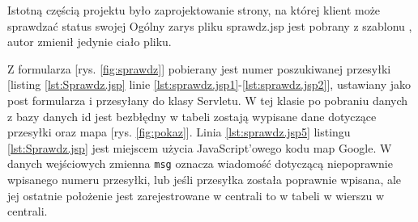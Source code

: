 \documentclass[eng,printmode,oneside]{mgr}
\begin{document}
Istotną częścią projektu było zaprojektowanie strony, na
której klient może sprawdzać status swojej  Ogólny zarys pliku sprawdz.jsp jest pobrany z szablonu \cite{szablon}, autor zmienił jedynie ciało pliku. 

Z formularza [rys. \ref{fig:sprawdz}] pobierany jest numer poszukiwanej
przesyłki [listing \ref{lst:Sprawdz.jsp} linie
\ref{lst:sprawdz.jsp1}-\ref{lst:sprawdz.jsp2}], ustawiany jako post formularza
i przesyłany do klasy Servletu. W tej klasie po pobraniu danych z bazy danych
  
id jest bezbłędny w tabeli zostają wypisane dane dotyczące przesyłki oraz mapa
[rys.
\ref{fig:pokaz}]. Linia
\ref{lst:sprawdz.jsp5} listingu \ref{lst:Sprawdz.jsp} jest miejscem użycia
JavaScript'owego kodu map Google. W danych wejściowych zmienna \texttt{msg}
oznacza wiadomość dotyczącą niepoprawnie wpisanego numeru przesyłki, lub jeśli
przesyłka została poprawnie wpisana, ale jej ostatnie położenie jest
zarejestrowane w centrali to w tabeli w wierszu
 w centrali.
\end{document}

